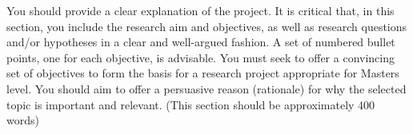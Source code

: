 
You should provide a clear explanation of the project. It is critical that, in this section, you include the research aim and objectives, as well as research questions and/or hypotheses in a clear and well-argued fashion. A set of numbered bullet points, one for each objective, is advisable. You must seek to offer a convincing set of objectives to form the basis for a research project appropriate for Masters level. You should aim to offer a persuasive reason (rationale) for why the selected topic is important and relevant. 
(This section should be approximately 400 words)
